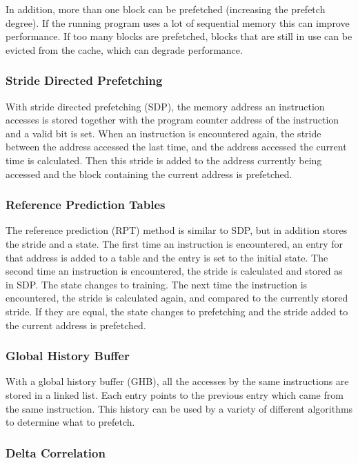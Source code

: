 In addition, more than one block can be prefetched (increasing the
prefetch degree). If the running program uses a lot of sequential
memory this can improve performance. If too many blocks are
prefetched, blocks that are still in use can be evicted from the
cache, which can degrade performance.

\subsubsection{Stride Directed Prefetching}

With stride directed prefetching (SDP), the memory address an instruction
accesses is stored together with the program counter address of the instruction
and a valid bit is set. When an instruction is encountered again, the stride
between the address accessed the last time, and the address accessed the
current time is calculated. Then this stride is added to the address currently
being accessed and the block containing the current address is prefetched.

\subsubsection{Reference Prediction Tables}

The reference prediction (RPT) method is similar to SDP, but in
addition stores the stride and a state. The first time an
instruction is encountered, an entry for that address is added to a table
and the entry is set to the initial state. The second time an
instruction is encountered, the stride is calculated and stored as in SDP.
The state changes to training. The next time the instruction is
encountered, the stride is calculated again, and compared to the
currently stored stride. If they are equal, the state changes to
prefetching and the stride added to the current address is
prefetched.

\subsubsection{Global History Buffer}

With a global history buffer (GHB), all the accesses by the same
instructions are stored in a linked list. Each entry points to
the previous entry which came from the same instruction. This
history can be used by a variety of different algorithms to
determine what to prefetch.

\subsubsection{Delta Correlation}


